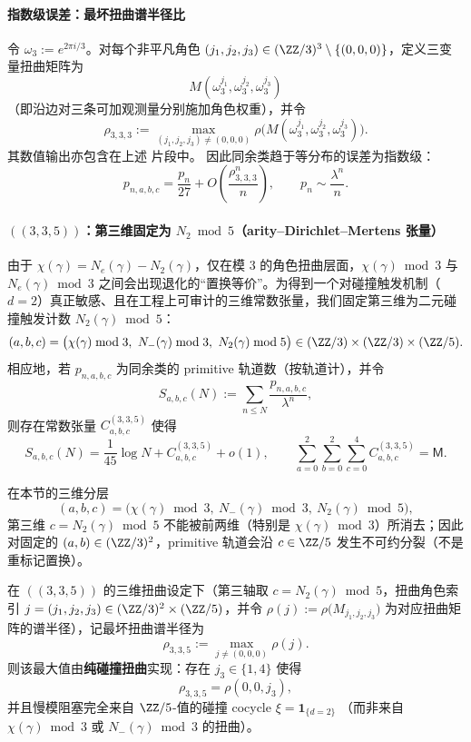 \paragraph{指数级误差：最坏扭曲谱半径比}
令 $\omega_3:=e^{2\pi i/3}$。对每个非平凡角色 $(j_1,j_2,j_3)\in(\ZZ/3)^3\setminus\{(0,0,0)\}$，定义三变量扭曲矩阵为
$$
M(\omega_3^{j_1},\omega_3^{j_2},\omega_3^{j_3})
$$
（即沿边对三条可加观测量分别施加角色权重），并令
$$
\rho_{3,3,3}
:=
\max_{(j_1,j_2,j_3)\neq(0,0,0)}
\rho\bigl(M(\omega_3^{j_1},\omega_3^{j_2},\omega_3^{j_3})\bigr).
$$
其数值输出亦包含在上述 \verb|| 片段中。
因此同余类趋于等分布的误差为指数级：
$$
p_{n,a,b,c}=\frac{p_n}{27}+O\!\left(\frac{\rho_{3,3,3}^n}{n}\right),
\qquad
p_n\sim\frac{\lambda^n}{n}.
$$

\paragraph{\texorpdfstring{$((3,3,5))$}{(3,3,5)}：第三维固定为 \texorpdfstring{$N_2\bmod 5$}{N2 mod 5}（arity--Dirichlet--Mertens 张量）}
由于 $\chi(\gamma)=N_e(\gamma)-N_2(\gamma)$，仅在模 $3$ 的角色扭曲层面，$\chi(\gamma)\bmod 3$ 与 $N_e(\gamma)\bmod 3$ 之间会出现退化的“置换等价”。为得到一个对碰撞触发机制（$d=2$）真正敏感、且在工程上可审计的三维常数张量，我们固定第三维为二元碰撞触发计数
\(
N_2(\gamma)\bmod 5
\)：
$$
(a,b,c)=\bigl(\chi(\gamma)\bmod 3,\ N_-(\gamma)\bmod 3,\ N_2(\gamma)\bmod 5\bigr)\in(\ZZ/3)\times(\ZZ/3)\times(\ZZ/5).
$$
相应地，若 $p_{n,a,b,c}$ 为同余类的 primitive 轨道数（按轨道计），并令
$$
S_{a,b,c}(N):=\sum_{n\le N}\frac{p_{n,a,b,c}}{\lambda^n},
$$
则存在常数张量 $C^{(3,3,5)}_{a,b,c}$ 使得
$$
S_{a,b,c}(N)=\frac{1}{45}\log N + C^{(3,3,5)}_{a,b,c}+o(1),
\qquad
\sum_{a=0}^2\sum_{b=0}^2\sum_{c=0}^4 C^{(3,3,5)}_{a,b,c}=\mathsf{M}.
$$
\begin{remark}\label{prop:arity-335-n2-nondegenerate}
在本节的三维分层
$$
(a,b,c)=\bigl(\chi(\gamma)\bmod 3,\ N_-(\gamma)\bmod 3,\ N_2(\gamma)\bmod 5\bigr),
$$
第三维 $c=N_2(\gamma)\bmod 5$ 不能被前两维（特别是 $\chi(\gamma)\bmod 3$）所消去；因此对固定的 $(a,b)\in(\ZZ/3)^2$，primitive 轨道会沿 $c\in\ZZ/5$ 发生不可约分裂（不是重标记置换）。
\end{remark}

\begin{remark}\label{prop:arity-335-collision-dominant}
在 \(((3,3,5))\) 的三维扭曲设定下（第三轴取 $c=N_2(\gamma)\bmod 5$，扭曲角色索引 $j=(j_1,j_2,j_3)\in(\ZZ/3)^2\times(\ZZ/5)$，并令
\(
\rho(j):=\rho\bigl(M_{j_1,j_2,j_3}\bigr)
\)
为对应扭曲矩阵的谱半径），记最坏扭曲谱半径为
$$
\rho_{3,3,5}:=\max_{j\neq (0,0,0)}\rho(j).
$$
则该最大值由\textbf{纯碰撞扭曲}实现：存在 $j_3\in\{1,4\}$ 使得
$$
\rho_{3,3,5}=\rho(0,0,j_3),
$$
并且慢模阻塞完全来自 $\ZZ/5$-值的碰撞 cocycle
\(
\xi=\mathbf{1}_{\{d=2\}}
\)
（而非来自 $\chi(\gamma)\bmod 3$ 或 $N_-(\gamma)\bmod 3$ 的扭曲）。
\end{remark}

